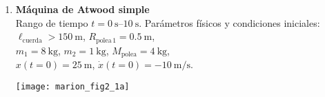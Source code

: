 \documentclass[11pt, spanish, a4paper, twoside]{article}
\begin{document}
\begin{enumerate}


\item 
\begin{minipage}[t][2.5cm]{0.7\textwidth}
\textbf{Máquina de Atwood simple}\\
Rango de tiempo \(t = \SIrange{0}{10}{\second}\).
Parámetros físicos y condiciones iniciales:\\
\(\ell_\mathrm{cuerda} > \SI{150}{\metre}\), 
\(R_{\mathrm{polea}\,1} = \SI{0.5}{\metre}\), \\ 
\(m_1 = \SI{8}{\kilo\gram}\), 
\(m_2 = \SI{1}{\kilo\gram}\), 
\(M_\mathrm{polea} = \SI{4}{\kilo\gram}\), \\
\(x(t=0) = \SI{25}{\metre}\), 
\(\dot{x}(t=0) = -\SI{10}{\metre\per\second}\).
\end{minipage}
\begin{minipage}[c][2cm][t]{0.3\textwidth}
	\hspace{0.5cm}
	\texttt{[image: marion\_fig2\_1a]}
\end{minipage}




\end{enumerate}
\end{document}
